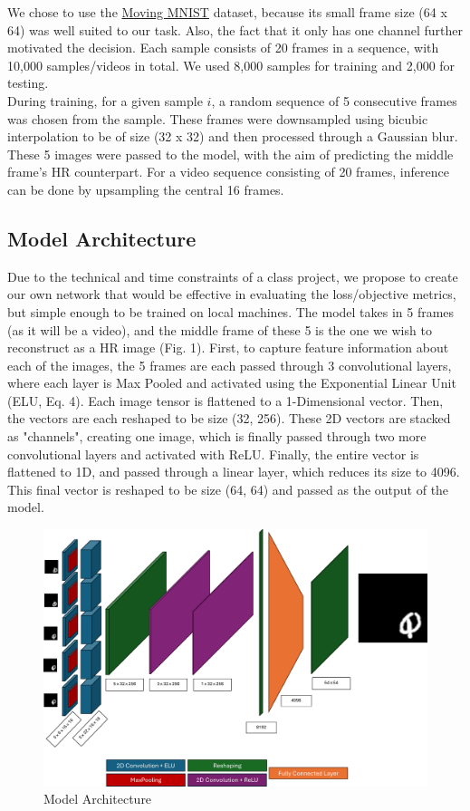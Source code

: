 \documentclass{article}
\begin{document}
We chose to use the \href{https://www.cs.toronto.edu/~nitish/unsupervised_video/}{Moving MNIST} dataset, because its small frame size (64 x 64) was well suited to our task. Also, the fact that it only has one channel further motivated the decision. Each sample consists of 20 frames in a sequence, with 10,000 samples/videos in total. We used 8,000 samples for training and 2,000 for testing. \\

During training, for a given sample \(i\), a random sequence of 5 consecutive frames was chosen from the sample. These frames were downsampled using bicubic interpolation to be of size (32 x 32) and then processed through a Gaussian blur. These 5 images were passed to the model, with the aim of predicting the middle frame's HR counterpart. For a video sequence consisting of 20 frames, inference can be done by upsampling the central 16 frames.

\subsection{Model Architecture}

Due to the technical and time constraints of a class project, we propose to create our own network that would be effective in evaluating the loss/objective metrics, but simple enough to be trained on local machines. The model takes in 5 frames (as it will be a video), and the middle frame of these 5 is the one we wish to reconstruct as a HR image (Fig. 1). First, to capture feature information about each of the images, the 5 frames are each passed through 3 convolutional layers, where each layer is Max Pooled and activated using the Exponential Linear Unit (ELU, Eq. 4). Each image tensor is flattened to a 1-Dimensional vector. Then, the vectors are each reshaped to be size (32, 256). These 2D vectors are stacked as "channels", creating one image, which is finally passed through two more convolutional layers and activated with ReLU. Finally, the entire vector is flattened to 1D, and passed through a linear layer, which reduces its size to 4096. This final vector is reshaped to be size (64, 64) and passed as the output of the model. 

\begin{figure}
    \centering
    \includegraphics[width=1.0\linewidth]{model_architecture.png}
    \caption{Model Architecture}
\end{figure}
\end{document}

